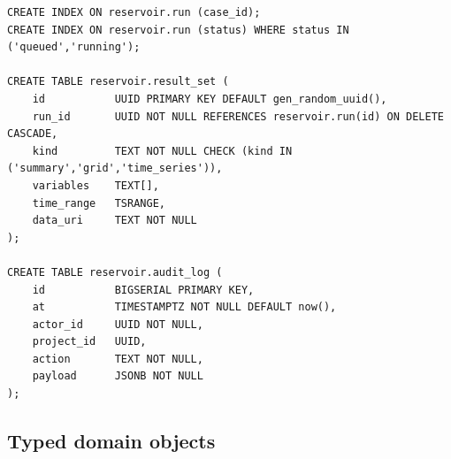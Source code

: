 \documentclass[11pt,a4paper]{article}
\begin{document}
\begin{lstlisting}[style=sql, caption={Selected DDL for the reservoir module.}]
CREATE INDEX ON reservoir.run (case_id);
CREATE INDEX ON reservoir.run (status) WHERE status IN ('queued','running');

CREATE TABLE reservoir.result_set (
    id           UUID PRIMARY KEY DEFAULT gen_random_uuid(),
    run_id       UUID NOT NULL REFERENCES reservoir.run(id) ON DELETE CASCADE,
    kind         TEXT NOT NULL CHECK (kind IN ('summary','grid','time_series')),
    variables    TEXT[],
    time_range   TSRANGE,
    data_uri     TEXT NOT NULL
);

CREATE TABLE reservoir.audit_log (
    id           BIGSERIAL PRIMARY KEY,
    at           TIMESTAMPTZ NOT NULL DEFAULT now(),
    actor_id     UUID NOT NULL,
    project_id   UUID,
    action       TEXT NOT NULL,
    payload      JSONB NOT NULL
);
\end{lstlisting}

\subsection{Typed domain objects}
\end{document}
